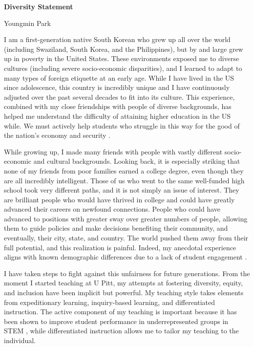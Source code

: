 \documentclass[a4paper,11pt]{article}
\begin{document}
\begin{center}
\Large \textbf{Diversity Statement}

\Large Youngmin Park
\end{center}

I am a first-generation native South Korean who grew up all over the world (including Swaziland, South Korea, and the Philippines), but by and large grew up in poverty in the United States. These environments exposed me to diverse cultures (including severe socio-economic disparities), and I learned to adapt to many types of foreign etiquette at an early age. While I have lived in the US since adolescence, this country is incredibly unique and I have continuously adjusted over the past several decades to fit into its culture. This experience, combined with my close friendships with people of diverse backgrounds, has helped me understand the difficulty of attaining higher education in the US while. We must actively help students who struggle in this way for the good of the nation's economy and security \cite{jones2018call}.

While growing up, I made many friends with people with vastly different socio-economic and cultural backgrounds. Looking back, it is especially striking that none of my friends from poor families earned a college degree, even though they are all incredibly intelligent. Those of us who went to the same well-funded high school took very different paths, and it is not simply an issue of interest. They are brilliant people who would have thrived in college and could have greatly advanced their careers on newfound connections. People who could have advanced to positions with greater sway over greater numbers of people, allowing them to guide policies and make decisions benefiting their community, and eventually, their city, state, and country. The world pushed them away from their full potential, and this realization is painful. Indeed, my anecdotal experience aligns with known demographic differences \cite{jones2018call} due to a lack of student engagement \cite{kokkelenberg2010succeeds,savaria2017critical}.

I have taken steps to fight against this unfairness for future generations. From the moment I started teaching at U Pitt, my attempts at fostering diversity, equity, and inclusion have been implicit but powerful. My teaching style takes elements from expeditionary learning, inquiry-based learning, and differentiated instruction. The active component of my teaching is important because it has been shown to improve student performance in underrepresented groups in STEM \cite{theobald2020active}, while differentiated instruction allows me to tailor my teaching to the individual.
\end{document}
